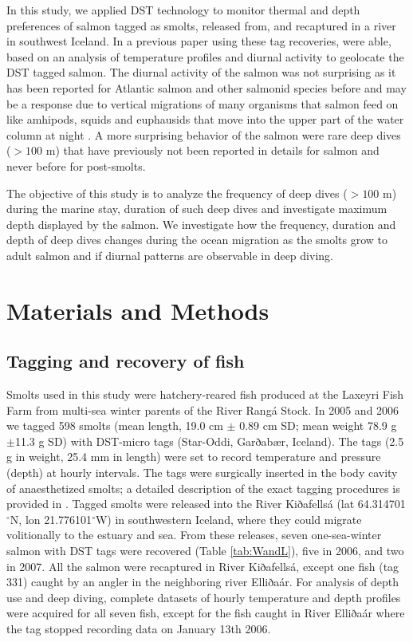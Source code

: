 In this study, we applied DST technology to monitor thermal and depth preferences of salmon tagged as smolts, released from, and recaptured in a river in southwest Iceland. 
In a previous paper using these tag recoveries, \cite{Gudjonsson2015} were able, based on an analysis of temperature profiles and diurnal activity to geolocate the DST tagged salmon.  
The diurnal activity of the salmon was not surprising as it has been reported for Atlantic salmon and other salmonid species before \citep{Reddin2011,Rikardsen2007,Walker2000} and may be a response due to vertical migrations of many organisms that salmon feed on like amhipods, squids and euphausids that move into the upper part of the water column at night \citep{Pearchy1984,Davis1998}.  
A more surprising behavior of the salmon were rare deep dives ($>100$ m) that have previously not been reported in details for salmon and never before for post-smolts.

The objective of this study is to analyze the frequency of deep dives ($>100$ m) during the marine stay, duration of such deep dives and investigate maximum depth displayed by the salmon. We investigate how the frequency, duration and depth of deep dives changes during the ocean migration as the smolts grow to adult salmon and if diurnal patterns are observable in deep diving.

\section{Materials and Methods}
\label{MnM}
\subsection{Tagging and recovery of fish}
Smolts used in this study were hatchery-reared fish produced at the Laxeyri Fish Farm from multi-sea winter parents of the River Rangá Stock. 
In 2005 and 2006 we tagged 598 smolts (mean length, 19.0 cm $\pm$ 0.89 cm SD; mean weight 78.9 g $\pm$11.3 g SD) with DST-micro tags (Star-Oddi, Garðabær, Iceland). 
The tags (2.5 g in weight, 25.4 mm in length) were set to record temperature and pressure (depth) at hourly intervals. The tags were surgically inserted in the body cavity of anaesthetized smolts; a detailed description of the exact tagging procedures is provided in \cite{Gudjonsson2015}. 
Tagged smolts were released into the River Kiðafellsá (lat 64.314701$^\circ$N, lon 21.776101$^\circ$W) in southwestern Iceland, where they could migrate volitionally to the estuary and sea. From these releases, seven one-sea-winter salmon with DST tags were recovered (Table \ref{tab:WandL}), five in 2006, and two in 2007. All the salmon were recaptured in River Kiðafellsá, except one fish (tag 331) caught by an angler in the neighboring river Elliðaár. For analysis of depth use and deep diving, complete datasets of hourly temperature and depth profiles were acquired for all seven fish, except for the fish caught in River Elliðaár where the tag stopped recording data on January 13th 2006.


